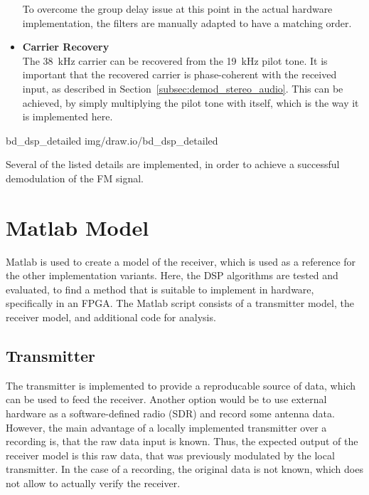 \begin{itemize}
      To overcome the group delay issue at this point in the actual hardware implementation, the filters are manually adapted to have a matching order.

  \item \textbf{Carrier Recovery}\\
      The 38~kHz carrier can be recovered from the 19~kHz pilot tone.
      It is important that the recovered carrier is phase-coherent with the received input, as described in Section~\ref{subsec:demod_stereo_audio}.
      This can be achieved, by simply multiplying the pilot tone with itself, which is the way it is implemented here.
\end{itemize}

 {bd_dsp_detailed} {img/draw.io/bd_dsp_detailed}

\noindent
Several of the listed details are implemented, in order to achieve a successful demodulation of the FM signal.

\section{Matlab Model}

Matlab is used to create a model of the receiver, which is used as a reference for the other implementation variants.
Here, the DSP algorithms are tested and evaluated, to find a method that is suitable to implement in hardware, specifically in an FPGA.
The Matlab script consists of a transmitter model, the receiver model, and additional code for analysis.

\subsection{Transmitter}

The transmitter is implemented to provide a reproducable source of data, which can be used to feed the receiver.
Another option would be to use external hardware as a software-defined radio (SDR) and record some antenna data.
However, the main advantage of a locally implemented transmitter over a recording is, that the raw data input is known.
Thus, the expected output of the receiver model is this raw data, that was previously modulated by the local transmitter.
In the case of a recording, the original data is not known, which does not allow to actually verify the receiver.\\

